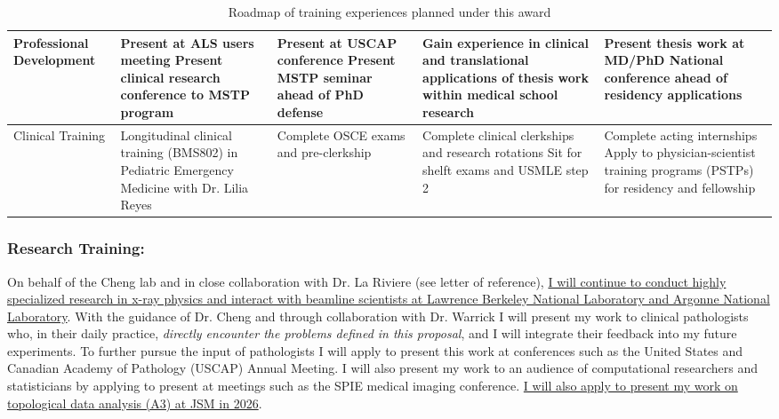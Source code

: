\documentclass{NIHGrant}
\begin{document}
\begin{table}[h]
\begin{tabularx}{\textwidth}{|l|>{\centering\arraybackslash}X|>{\centering\arraybackslash}X|>{\centering\arraybackslash}X|>{\centering\arraybackslash}X|}
\hline
    Professional Development &
    Present at ALS users meeting
    Present clinical research conference to MSTP program &
    Present at USCAP conference \newline
    Present MSTP seminar ahead of PhD defense&
    Gain experience in clinical and translational applications of thesis work within medical school research &
    Present thesis work at MD/PhD National conference ahead of residency applications \\
    \hline
    Clinical Training &
    Longitudinal clinical training (BMS802) in Pediatric Emergency Medicine with Dr. Lilia Reyes &
    Complete OSCE exams and pre-clerkship &
    Complete clinical clerkships and research rotations \newline
    Sit for shelft exams and USMLE step 2 &
    Complete acting internships \newline Apply to physician-scientist training programs (PSTPs) for residency and fellowship\\
  \hline
\end{tabularx}
\caption{Roadmap of training experiences planned under this award}
\label{tab:goals}
\end{table}

\subsubsection*{Research Training: }
 On behalf of the Cheng lab and in close collaboration with Dr. La Riviere (see letter of reference), \uline{I will continue to conduct highly specialized research in x-ray physics and interact with beamline scientists at Lawrence Berkeley National Laboratory and Argonne National Laboratory}. With the guidance of Dr. Cheng and through collaboration with Dr. Warrick I will present my work to clinical pathologists who, in their daily practice, \emph{directly encounter the problems defined in this proposal}, and I will integrate their feedback into my future experiments. To further pursue the input of pathologists I will apply to present this work at conferences such as the United States and Canadian Academy of Pathology (USCAP) Annual Meeting. I will also present my work to an audience of computational researchers and statisticians by applying to present at meetings such as the SPIE medical imaging conference. \uline{I will also apply to present my work on topological data analysis (A3) at JSM in 2026}.
\end{document}
